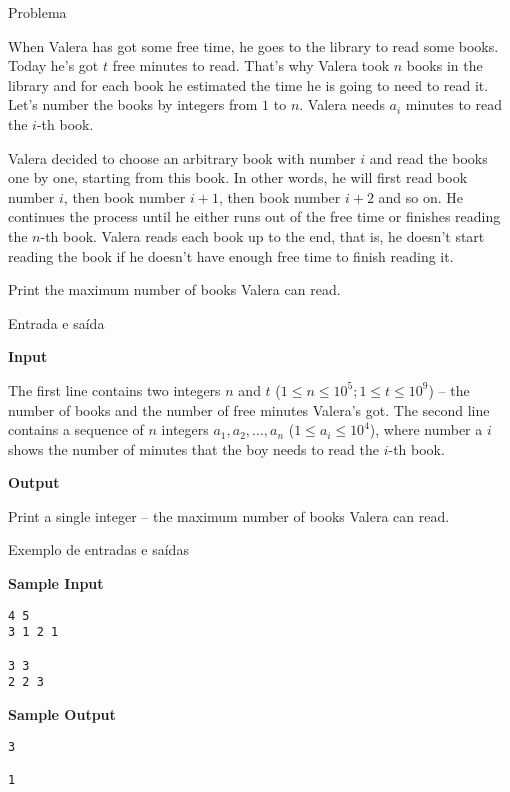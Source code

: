 
\begin{frame}[fragile]{Problema}

When Valera has got some free time, he goes to the library to read some books. Today he's got $t$
free minutes to read. That's why Valera took $n$ books in the library and for each book he 
estimated the time he is going to need to read it. Let's number the books by integers from $1$ to
$n$. Valera needs $a_i$ minutes to read the $i$-th book.

Valera decided to choose an arbitrary book with number $i$ and read the books one by one, starting
from this book. In other words, he will first read book number $i$, then book number $i + 1$, then
book number $i + 2$ and so on. He continues the process until he either runs out of the free time
or finishes reading the $n$-th book. Valera reads each book up to the end, that is, he doesn't
start reading the book if he doesn't have enough free time to finish reading it.

Print the maximum number of books Valera can read.
\end{frame}

\begin{frame}[fragile]{Entrada e saída}

\textbf{Input}

The first line contains two integers $n$ and $t$ ($1\leq n\leq 10^5; 1\leq t\leq 10^9$) -- the
number of books and the number of free minutes Valera's got. The second line contains a sequence
of $n$ integers $a_1, a_2, \ldots, a_n$ ($1\leq a_i\leq 10^4$), where number a $i$ shows the
number of minutes that the boy needs to read the $i$-th book.

\vspace{0.2in}

\textbf{Output}

Print a single integer -- the maximum number of books Valera can read.

\end{frame}

\begin{frame}[fragile]{Exemplo de entradas e saídas}

\begin{minipage}[t]{0.5\textwidth}
\textbf{Sample Input}
\begin{verbatim}
4 5
3 1 2 1

3 3
2 2 3
\end{verbatim}
\end{minipage}
\begin{minipage}[t]{0.45\textwidth}
\textbf{Sample Output}
\begin{verbatim}
3

1
\end{verbatim}
\end{minipage}
\end{frame}

